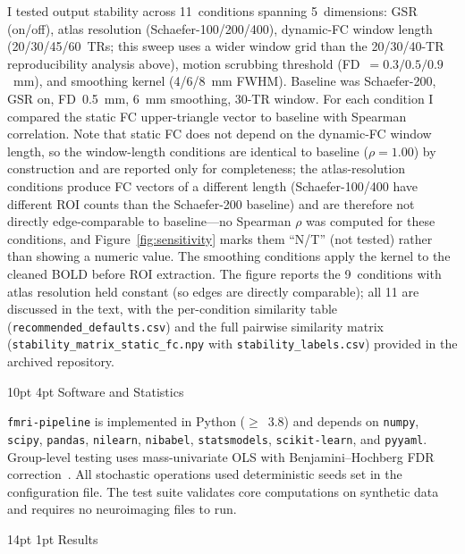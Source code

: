 \documentclass[12pt]{article}
\makeatletter
\renewcommand\section{%
  \@startsection{section}{1}{\z@}%
    {14pt \@plus 4pt \@minus 2pt}%
    {1pt}%
    {\normalfont\large\bfseries\color{black}}}
\renewcommand\subsection{%
  \@startsection{subsection}{2}{\z@}%
    {10pt \@plus 2pt \@minus 1pt}%
    {4pt}%
    {\normalfont\normalsize\bfseries}}
\makeatother
\begin{document}
I tested output stability across 11~conditions spanning 5~dimensions:
GSR (on/off), atlas resolution (Schaefer-100/200/400), dynamic-FC
window length (20/30/45/60~TRs; this sweep uses a wider window grid than
the 20/30/40-TR reproducibility analysis above), motion scrubbing threshold
(FD~$= 0.3/0.5/0.9$~mm), and smoothing kernel (4/6/8~mm FWHM).
Baseline was Schaefer-200, GSR on, FD~0.5~mm, 6~mm smoothing,
30-TR window. For each condition I compared the static FC
upper-triangle vector to baseline with Spearman correlation. Note that
static FC does not depend on the dynamic-FC window length, so the
window-length conditions are identical to baseline ($\rho = 1.00$) by
construction and are reported only for completeness; the
atlas-resolution conditions produce FC vectors of a different length
(Schaefer-100/400 have different ROI counts than the Schaefer-200
baseline) and are therefore not directly edge-comparable to
baseline---no Spearman $\rho$ was computed for these conditions, and
Figure~\ref{fig:sensitivity} marks them ``N/T'' (not tested) rather
than showing a numeric value. The smoothing conditions apply the kernel
to the cleaned BOLD before ROI extraction. The
figure reports the 9~conditions with atlas resolution held constant
(so edges are directly comparable); all 11 are discussed in the
text, with the per-condition similarity table
(\texttt{recommended\_defaults.csv}) and the full pairwise similarity
matrix (\texttt{stability\_matrix\_static\_fc.npy} with
\texttt{stability\_labels.csv}) provided in the archived repository.

\subsection{Software and Statistics}

\texttt{fmri-pipeline} is implemented in Python ($\geq$~3.8) and
depends on \texttt{numpy}, \texttt{scipy}, \texttt{pandas},
\texttt{nilearn}, \texttt{nibabel}, \texttt{statsmodels},
\texttt{scikit-learn}, and \texttt{pyyaml}. Group-level testing uses
mass-univariate OLS with Benjamini--Hochberg FDR
correction~\citep{benjamini1995controlling}. All stochastic operations
used deterministic seeds set in the configuration file. The test suite
validates core computations on synthetic data and requires no
neuroimaging files to run.

\section{Results}
\end{document}
